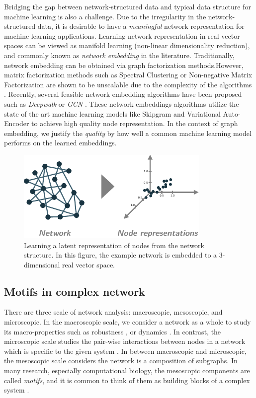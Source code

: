 \documentclass{article}
\theoremstyle{definition}
\begin{document}
Bridging the gap between network-structured data and typical
data structure for machine learning is also a challenge. 
Due to the irregularity in the network-structured data, 
it is desirable to have a \emph{meaningful}
network representation for machine learning applications. 
Learning network representation in real vector spaces can be
viewed as manifold learning (non-linear dimensionality reduction),
and commonly known as \emph{network embedding} in the literature.  
Traditionally, network embedding can be obtained via graph 
factorization methods.However, matrix factorization methods such as
Spectral Clustering or Non-negative Matrix Factorization are 
shown to be unscalable due to the complexity of the algorithms 
\cite{deepwalk,eigmaps}. Recently, several feasible network
embedding algorithms have been proposed such as \emph{Deepwalk}
\cite{deepwalk} or \emph{GCN} \cite{gcn}. These network embeddings 
algorithms utilize the state of the art machine learning models like
Skipgram \cite{Skipgram} and Variational Auto-Encoder \cite{varauto}
to achieve high quality node representation. In the context of graph
embedding, we justify the \emph{quality} by how well a common
machine learning model performs on the learned embeddings.

\begin{figure} \label{fig:cartoon}
    \centering
    \includegraphics[width=0.8\linewidth]{cartoon_emb}
    \caption{Learning a latent representation of nodes from the network structure. In this figure, the example network is embedded to a 3-dimensional real vector space.}
\end{figure}

\subsection{Motifs in complex network}

There are three scale of network analysis: macroscopic, mesoscopic, 
and microscopic. In the macroscopic scale, we consider a network as a 
whole to study its macro-properties such as robustness 
\cite{callaway2000network}, or dynamics \cite{barabasi2014network}.
In contrast, the microscopic scale studies the pair-wise interactions
between nodes in a network which is specific to the given system 
\cite{physicnet}. In between macroscopic and microscopic, the mesoscopic 
scale considers the network is a composition of subgraphs. 
In many research, especially computational biology, the
mesoscopic components are called \emph{motifs}, and it is common
to think of them as building blocks of a complex system 
\cite{motifblockmilo}.
\end{document}
